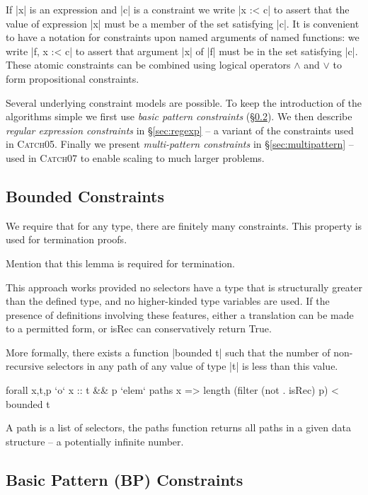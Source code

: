 \documentclass[preprint]{sigplanconf}
\newcommand{\C}[1]{\textsf{#1}}
\newcommand{\catch}{\textsc{Catch}}
\newenvironment{discuss}
    {\noindent\hspace{-1.5mm}\vline\hspace{1mm}\vline\hspace{1mm}\begin{minipage}[h]{\linewidth}}
    {\end{minipage}}
\begin{document}
If |x| is an expression and |c| is a constraint we write |x :< c| to assert that the value of expression |x| must be a member of the set satisfying |c|. It is convenient to have a notation for constraints upon named arguments of named functions: we write |f, x :< c| to assert that argument |x| of |f| must be in the set satisfying |c|. These atomic constraints can be combined using logical operators $\wedge{}$ and $\vee{}$ to form propositional constraints.

Several underlying constraint models are possible. To keep the introduction of the algorithms simple we first use \textit{basic pattern constraints} (\S\ref{sec:basic}). We then describe \textit{regular expression constraints} in \S\ref{sec:regexp} -- a variant of the constraints used in \catch05. Finally we present \textit{multi-pattern constraints} in \S\ref{sec:multipattern} -- used in \catch07 to enable scaling to much larger problems.

\subsection{Bounded Constraints}
\label{sec:bounded}

\begin{discuss}
We require that for any type, there are finitely many constraints. This property is used for termination proofs.

Mention that this lemma is required for termination.

This approach works provided no selectors have a type that is structurally greater than the defined type, and no higher-kinded type variables are used. If the presence of definitions involving these features, either a translation can be made to a permitted form, or \C{isRec} can conservatively return True.

More formally, there exists a function |bounded t| such that the number of non-recursive selectors in any path of any value of type |t| is less than this value.

\begin{code}
forall x,t,p `o`  x :: t && p `elem` paths x =>
                  length (filter (not . isRec) p) < bounded t
\end{code}

A path is a list of selectors, the \C{paths} function returns all paths in a given data structure -- a potentially infinite number.
\end{discuss}


\subsection{Basic Pattern (BP) Constraints}
\label{sec:basic}
\end{document}
